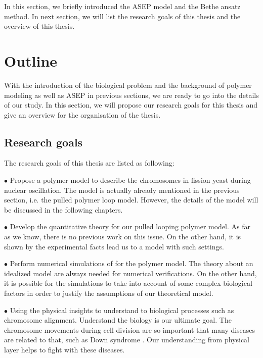 In this section, we briefly introduced the ASEP model and the Bethe ansatz method. In next section, we will list the research goals of this thesis and the overview of this thesis.


\section{Outline}  %
\label{sec:outline}
With the introduction of the biological problem and the background of polymer modeling as well as ASEP in previous sections, we are ready to go into the details of our study. In this section, we will propose our research goals for this thesis and give an overview for the organisation of the thesis.  

\subsection{Research goals}
\label{sub:research_goal}

The research goals of this thesis are listed as following:

$\bullet$ Propose a polymer model to describe the chromosomes in fission yeast during nuclear oscillation. The model is actually already mentioned in the previous section, i.e. the pulled polymer loop model. However, the details of the model will be discussed in the following chapters.

$\bullet$ Develop the quantitative theory for our pulled looping polymer model. As far as we know, there is no previous work on this issue. On the other hand, it is shown by the experimental facts lead us to a model with such settings.

$\bullet$ Perform numerical simulations of for the polymer model. The theory about an idealized model are always needed for numerical verifications. On the other hand, it is possible for the simulations to take into account of some complex biological factors in order to justify the assumptions of our theoretical model.

$\bullet$ Using the physical insights to understand to biological processes such as chromosome alignment. Understand the biology is our ultimate goal. The chromosome movements during cell division are so important that many diseases are related to that, such as Down syndrome \cite{Patterson2009}. Our understanding from physical layer helps to fight with these diseases.


